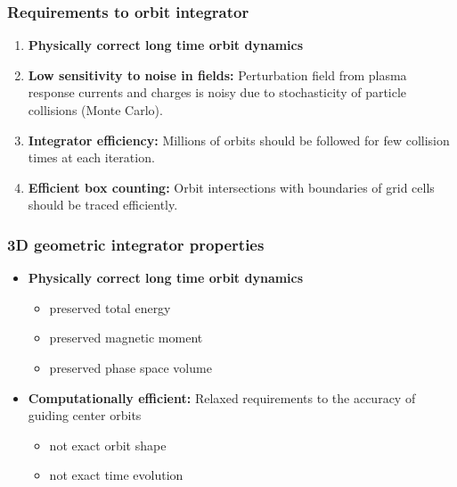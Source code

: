 \documentclass{beamer}
\begin{document}
\begin{frame}
\frametitle{Requirements to orbit integrator}
\vspace{-0.5cm}
\begin{enumerate}
\item \textbf{Physically correct long time orbit dynamics}
\item \textbf{Low sensitivity to noise in fields:} Perturbation field from plasma response currents and charges is noisy due to stochasticity of particle collisions (Monte Carlo).
\item \textbf{Integrator efficiency:} Millions of orbits should be followed for few collision times at each iteration.
\item \textbf{Efficient box counting:} Orbit intersections with boundaries of grid cells should be traced efficiently.

\end{enumerate}
\end{frame}


\begin{frame}
\frametitle{3D geometric integrator properties}
\vspace{-0.5cm}
\begin{itemize}
	\item \textbf{Physically correct long time orbit dynamics}
	\begin{itemize}
		\item preserved total energy
		\item preserved magnetic moment
		\item preserved phase space volume 
	\end{itemize}
	\item \textbf{Computationally efficient:} Relaxed requirements to the accuracy of guiding center orbits
		\begin{itemize}
			\item not exact orbit shape
			\item not exact time evolution
		\end{itemize}
\end{itemize}
\end{frame}
\end{document}
